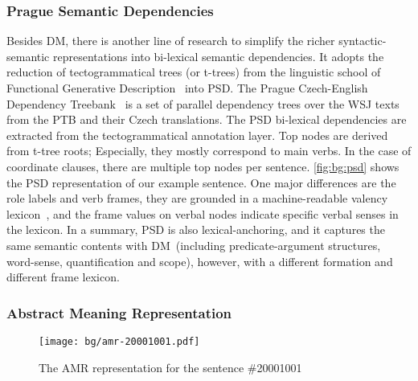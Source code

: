 \subsubsection{Prague Semantic Dependencies}
\label{sssec:bg:psd}
Besides DM, there is another line of research to simplify the richer
syntactic-semantic representations into bi-lexical semantic
dependencies. It adopts the reduction of tectogrammatical trees (or
t-trees) from the linguistic school of Functional Generative
Description~\citep[FGD,][]{Sga:Haj:Pan:86,hajic2012announcing} into
PSD. The Prague Czech-English Dependency
Treebank~\citep[PCEDT,][]{hajic2012announcing} is a set of parallel
dependency trees over the WSJ texts from the PTB and their Czech
translations. The PSD bi-lexical dependencies are extracted from the
tectogrammatical annotation layer. Top nodes are derived from t-tree
roots; Especially, they mostly correspond to main verbs. In the case
of coordinate clauses, there are multiple top nodes per
sentence. \autoref{fig:bg:psd} shows the PSD representation of our
example sentence. One major differences are the role labels and verb
frames, they are grounded in a machine-readable valency
lexicon~\citep{urevsova2016czengvallex}, and the frame values on
verbal nodes indicate specific verbal senses in the
lexicon. In a summary, PSD is also lexical-anchoring, and it
  captures the same semantic contents with DM~(including
  predicate-argument structures, word-sense, quantification and
  scope), however, with a different formation and different frame
  lexicon.



\subsubsection{Abstract Meaning Representation}
\label{ssec:bg:amr}
%
\begin{figure}[!tbp]
\centering
\texttt{[image: bg/amr-20001001.pdf]}
\caption{\label{fig:bg:amr} The AMR representation for the sentence
  \#20001001}
\end{figure}

